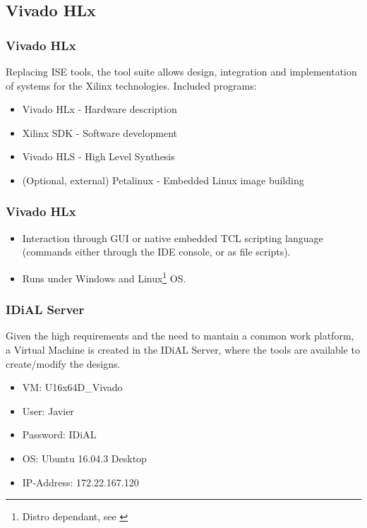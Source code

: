 
\subsection{Vivado HLx}

\begin{frame}
	\frametitle{Vivado HLx}
	Replacing ISE tools, the tool suite allows design, integration and implementation of systems for the Xilinx technologies.
	\vfill \pause
	Included programs:
	\begin{itemize}
		\item Vivado HLx - Hardware description \pause
		\item Xilinx SDK - Software development \pause
		\item Vivado HLS - High Level Synthesis \pause
		\item (Optional, external) Petalinux - Embedded Linux image building
	\end{itemize}
\end{frame}

\begin{frame}
	\frametitle{Vivado HLx}
	\begin{itemize}
		\item Interaction through GUI or native embedded TCL scripting language (commands either through the IDE console, or as file scripts).
		\vspace{2 em}
		\item Runs under Windows and Linux\footnote[frame]{Distro dependant, see \cite{UG973}} OS.
	\end{itemize}
\end{frame}

\begin{frame}
	\frametitle{IDiAL Server}
	Given the high requirements and the need to mantain a common work platform, a Virtual Machine is created in the IDiAL Server, where the tools are available to create/modify the designs.
	\vfill
	\begin{itemize}
		\item VM: U16x64D\_Vivado
		\item User: Javier
		\item Password: IDiAL
		\item OS: Ubuntu 16.04.3 Desktop
		\item IP-Address: 172.22.167.120
	\end{itemize}
\end{frame}

